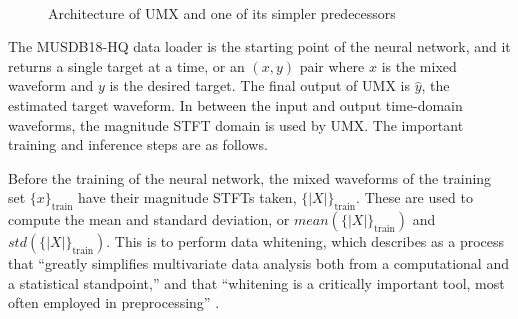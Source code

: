\documentclass[report.tex]{subfiles}
\begin{document}
\begin{figure}[ht]
	\centering
	\\
	\caption{Architecture of UMX and one of its simpler predecessors}
	\label{fig:umxes}
\end{figure}


The MUSDB18-HQ data loader is the starting point of the neural network, and it returns a single target at a time, or an $(x, y)$ pair where $x$ is the mixed waveform and $y$ is the desired target. The final output of UMX is $\hat{y}$, the estimated target waveform. In between the input and output time-domain waveforms, the magnitude STFT domain is used by UMX. The important training and inference steps are as follows.

Before the training of the neural network, the mixed waveforms of the training set $\{x\}_{\text{train}}$ have their magnitude STFTs taken, $\{|X|\}_{\text{train}}$. These are used to compute the mean and standard deviation, or $\mathit{mean}(\{|X|\}_{\text{train}})$ and $\mathit{std}(\{|X|\}_{\text{train}})$. This is to perform data whitening, which \citeauthor{Kessy_2018} describes as a process that ``greatly simplifies multivariate data analysis both from a computational and a statistical standpoint,'' and that ``whitening is a critically important tool, most often employed in preprocessing'' \parencite[309]{Kessy_2018}.
\end{document}
